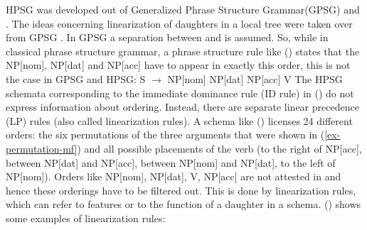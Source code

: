 \documentclass[output=paper
                ,modfonts
                ,nonflat
	        ,collection
	        ,collectionchapter
	        ,collectiontoclongg
 	        ,biblatex
                ,babelshorthands
                ,newtxmath
                ,draftmode
                ,colorlinks, citecolor=brown
]{./langsci/langscibook}
\begin{document}
HPSG was developed out of Generalized Phrase Structure Grammar\indexgpsg (GPSG) and . The ideas concerning linearization of
daughters in a local tree were taken over from GPSG \citep*[Section~3.2]{GKPS85a}. In GPSG a separation between
 and  is assumed. So, while in classical phrase structure
grammar, a phrase structure rule like () states that the NP[nom], NP[dat] and NP[acc] have to
appear in exactly this order, this is not the case in GPSG and HPSG:
\ea
\label{rule-s-np-np-np-v}
S $\to$ NP[nom] NP[dat] NP[acc] V
\z
The HPSG schemata corresponding to the immediate dominance rule (ID rule) in () do not express information
about ordering. Instead, there are separate linear precedence (LP) rules
(also called linearization rules). A schema like () licenses 24 
different orders: the six permutations of the three arguments that were shown in
(\ref{ex-permutation-mf}) and all possible placements of the verb (to the right of NP[acc], between
NP[dat] and NP[acc], between NP[nom] and NP[dat], to the left of NP[nom]). Orders like NP[nom],
NP[dat], V, NP[acc] are not attested in  and hence these orderings have to be filtered
out. This is done by linearization rules, which can refer to features or to the function of a
daughter in a schema. () shows some examples of linearization rules:
\end{document}
